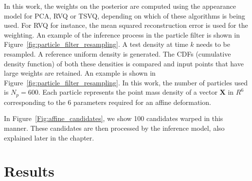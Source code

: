 \begin{Body}
In this work, the weights on the posterior are computed using the appearance model for PCA, RVQ or TSVQ, depending on which of these algorithms is being used.  For RVQ for instance, the mean squared reconstruction error is used for the weighting.  An example of the inference process in the particle filter is shown in Figure~\ref{fig:particle_filter_resampling}.  A test density at time $k$ needs to be resampled.  A reference uniform density is generated.  The CDFs (cumulative density function) of both these densities is compared and input points that have large weights are retained.  An example is shown in Figure~\ref{fig:particle_filter_resampling}.  In this work, the number of particles used is $N_p=600$.  Each particle represents the point mass density of a vector $\mathbf{X}$ in $R^6$ corresponding to the 6 parameters required for an affine deformation.

In Figure~\ref{Fig:affine_candidates}, we show 100 candidates warped in this manner.  These candidates are then processed by the inference model, also explained later in the chapter.





								

	



\section{Results}



\end{Body}
